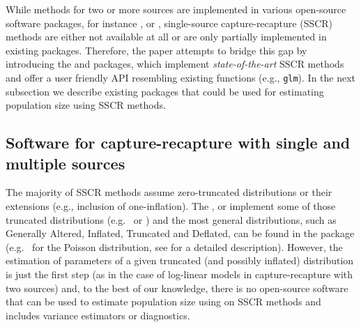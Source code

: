 \documentclass[nojss]{jss}
\newcommand{\1}{\mathcal{I}} \newcommand{\bZero}{\boldsymbol{0}}
\begin{document}
While methods for two or more sources are implemented in various
open-source software packages, for instance 
\citep{baillargeon2007rcapture},  \citep{laake2013marked} or
 \citep{yee2015vgam}, single-source capture-recapture (SSCR)
methods are either not available at all or are only partially
implemented in existing  packages. Therefore, the paper
attempts to bridge this gap by introducing the  and
 packages, which implement
\emph{state-of-the-art} SSCR methods and offer a user friendly API
resembling existing  functions (e.g., \texttt{glm}). In the
next subsection we describe existing  packages that could be
used for estimating population size using SSCR methods.

\subsection{Software for capture-recapture with single and multiple
sources}\label{sec-software}

The majority of SSCR methods assume zero-truncated distributions or
their extensions (e.g., inclusion of one-inflation). The 
\citep{countreg},  \citep{VGAM-main} or 
\citep{distributions3} implement some of those truncated distributions
(e.g.~ or )
and the most general distributions, such as Generally Altered, Inflated,
Truncated and Deflated, can be found in the  package
(e.g.~ for the Poisson distribution, see
\citet{gaitdcount} for a detailed description). However, the estimation
of parameters of a given truncated (and possibly inflated) distribution
is just the first step (as in the case of log-linear models in
capture-recapture with two sources) and, to the best of our knowledge,
there is no open-source software that can be used to estimate population
size using on SSCR methods and includes variance estimators or
diagnostics.
\end{document}
